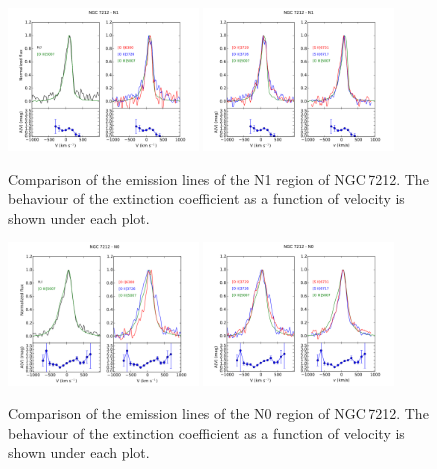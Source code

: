 \documentclass[../main.tex]{subfiles}
\begin{document}
\begin{figure}
\centering
\includegraphics[width=0.45\textwidth]{images/paper1/NGC7212_n1_l1.pdf} \quad
\includegraphics[width=0.45\textwidth]{images/paper1/NGC7212_n1_l2.pdf}\\
\caption[]{Comparison of the emission lines of the N1 region of NGC\,7212. The behaviour of the extinction coefficient as a function of velocity is shown under each plot.}
\label{fig:n1l1_N}
\end{figure}

\begin{figure}
\centering
\includegraphics[width=0.45\textwidth]{images/paper1/NGC7212_n0_l1.pdf} \quad
\includegraphics[width=0.45\textwidth]{images/paper1/NGC7212_n0_l2.pdf}\\
\caption[]{Comparison of the emission lines of the N0 region of NGC\,7212. The behaviour of the extinction coefficient as a function of velocity is shown under each plot.}
\label{fig:n0l1_N}
\end{figure}
\end{document}

